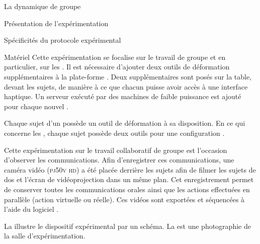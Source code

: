 \documentclass[myfrancais,ngerman,english,frenchb]{mythesis}
\begin{document}
\begin{mychapter}{La dynamique de groupe}
\begin{mysection}{Présentation de l'expérimentation}
\begin{mysubsection}{Spécificités du protocole expérimental}
				\begin{mysubsubsection}[sss-exp3-Materiel]{Matériel}
					Cette expérimentation se focalise sur le travail de groupe et en particulier, sur les .
					Il est nécessaire d'ajouter deux outils de déformation supplémentaires à la plate-forme .
					Deux \myOmni supplémentaires sont posés sur la table, devant les sujets, de manière à ce que chacun puisse avoir accès à une interface haptique.
					Un serveur  exécuté par des machines de faible puissance est ajouté pour chaque nouvel \myOmni.

					Chaque sujet d'un  possède un outil de déformation à sa disposition.
					En ce qui concerne les , chaque sujet possède deux outils pour une configuration .

					Cette expérimentation sur le travail collaboratif de groupe est l'occasion d'observer les communications.
					Afin d'enregistrer ces communications, une caméra vidéo \mySony (\textsc{pj50v hd}) a été placée derrière les sujets afin de filmer les sujets de dos et l'écran de vidéoprojection dans un même plan.
					Cet enregistrement permet de conserver toutes les communications orales ainsi que les actions effectuées en parallèle (action virtuelle ou réelle).
					Ces vidéos sont exportées et séquencées \myafortiori à l'aide du logiciel \myiMovie.

					La  illustre le dispositif expérimental par un schéma.
					La  est une photographie de la salle d'expérimentation.


\end{mysubsubsection}
\end{mysubsection}
\end{mysection}
\end{mychapter}
\end{document}
